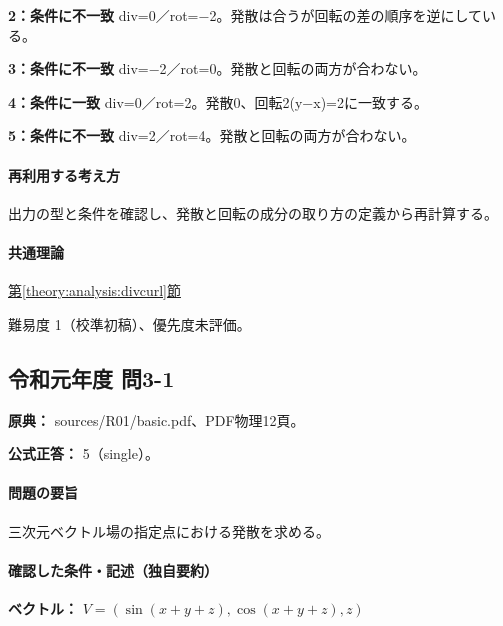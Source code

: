 \noindent\textbf{2：条件に不一致} div=\allowbreak{}0／rot=−2。発散は合うが回転の差の順序を逆にしている。\par

\noindent\textbf{3：条件に不一致} div=−2／rot=\allowbreak{}0。発散と回転の両方が合わない。\par

\noindent\textbf{4：条件に一致} div=\allowbreak{}0／rot=\allowbreak{}2。発散0、回転2(y−x)=\allowbreak{}2に一致する。\par

\noindent\textbf{5：条件に不一致} div=\allowbreak{}2／rot=\allowbreak{}4。発散と回転の両方が合わない。\par

\paragraph{再利用する考え方} 出力の型と条件を確認し、発散と回転の成分の取り方の定義から再計算する。

\paragraph{共通理論} \hyperref[theory:analysis:divcurl]{第\ref*{theory:analysis:divcurl}節}

\par 難易度 1（校準初稿）、優先度未評価。

\subsection{令和元年度 問3-1}
\label{q:r01-reg-basic-3-1}

\noindent\textbf{原典：} sources/R01/basic.pdf、PDF物理12頁。

\textbf{公式正答：} 5（single）。

\paragraph{問題の要旨} 三次元ベクトル場の指定点における発散を求める。

\paragraph{確認した条件・記述（独自要約）}\mbox{}\par

\noindent\textbf{ベクトル：} \(V=(\sin(x+y+z),\cos(x+y+z),z)\)\par

